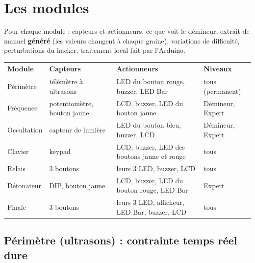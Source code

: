 \documentclass[11pt,a4paper]{article}
\begin{document}
\section{Les modules}
\label{sec:modules}

Pour chaque module : capteurs et actionneurs, ce que voit le démineur, extrait de manuel \textbf{généré} (les valeurs changent à chaque graine), variations de difficulté, perturbations du hacker, traitement local fait par l'Arduino.

\begin{center}\small
\begin{tabularx}{\linewidth}{P{2.2cm}LLP{2.4cm}}
\toprule
\textbf{Module} & \textbf{Capteurs} & \textbf{Actionneurs} & \textbf{Niveaux} \\
\midrule
Périmètre & télémètre à ultrasons & LED du bouton rouge, buzzer, LED Bar & tous (permanent) \\
Fréquence & potentiomètre, bouton jaune & LCD, buzzer, LED du bouton jaune & Démineur, Expert \\
Occultation & capteur de lumière & LED du bouton bleu, buzzer, LCD & Démineur, Expert \\
Clavier & keypad & LCD, buzzer, LED des boutons jaune et rouge & tous \\
Relais & 3 boutons & leurs 3 LED, buzzer, LCD & tous \\
Détonateur & DIP, bouton jaune & LCD, buzzer, LED du bouton rouge, LED Bar & Expert \\
Finale & 3 boutons & leurs 3 LED, afficheur, LED Bar, buzzer, LCD & tous \\
\bottomrule
\end{tabularx}
\end{center}

\subsection{Périmètre (ultrasons) : contrainte temps réel dure}
\label{sec:perimetre}
\end{document}
